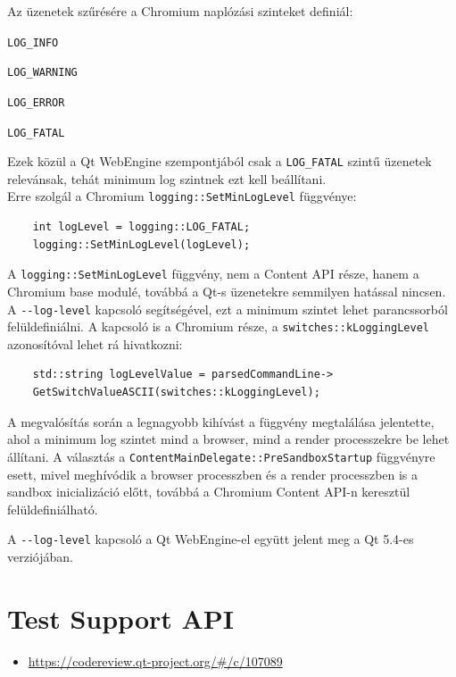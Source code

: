 \documentclass[12pt]{report}
\let\origurl\url
\renewcommand{\url}[1]{%
    \textcolor{blue}{\origurl{#1}}
}
\newcommand{\gerrit}[1]{%
    \textcolor{qtgreen}{\origurl{https://codereview.qt-project.org/\#/c/#1}}
}
\begin{document}
Az üzenetek szűrésére a Chromium naplózási szinteket definiál:
\begin{description}[
            labelsep=-0.5cm,
            itemsep=0cm,
            before={\renewcommand\makelabel[1]{\bfseries ##1}}]
    \item[0] \texttt{LOG\_INFO}
    \item[1] \texttt{LOG\_WARNING}
    \item[2] \texttt{LOG\_ERROR}
    \item[3] \texttt{LOG\_FATAL}
\end{description}
Ezek közül a Qt WebEngine szempontjából csak a \texttt{LOG\_FATAL} szintű üzenetek
relevánsak, tehát minimum log szintnek ezt kell beállítani. \\
Erre szolgál a Chromium \texttt{logging::SetMinLogLevel} függvénye:
\begin{verbatim}
    int logLevel = logging::LOG_FATAL;
    logging::SetMinLogLevel(logLevel);
\end{verbatim}
A \texttt{logging::SetMinLogLevel} függvény, nem a Content API része, hanem a \\
Chromium base modulé, továbbá a Qt-s üzenetekre semmilyen hatással nincsen. \\
A \texttt{-{}-log-level} kapcsoló segítségével, ezt a minimum szintet lehet
parancssorból felüldefiniálni. A kapcsoló is a Chromium része, a
\texttt{switches::kLoggingLevel} azonosítóval lehet rá hivatkozni:
\begin{verbatim}
    std::string logLevelValue = parsedCommandLine->
    GetSwitchValueASCII(switches::kLoggingLevel);
\end{verbatim}

A megvalósítás során a legnagyobb kihívást a függvény megtalálása jelentette, ahol a minimum
log szintet mind a browser, mind a render processzekre be lehet állítani.
A választás a \texttt{ContentMainDelegate::PreSandboxStartup} függvényre esett, mivel
meghívódik a browser processzben és a render processzben is a sandbox inicializáció előtt,
továbbá a Chromium Content API-n keresztül felüldefiniálható.

A \texttt{-{}-log-level} kapcsoló a Qt WebEngine-el együtt jelent meg a Qt 5.4-es
verziójában.


\section{Test Support API}

\begin{center}
    \begin{reviewbox}
        \begin{itemize}
            \renewcommand{\labelitemi}{\textcolor{qtgreen}{$\blacktriangleright$}}
            \item \gerrit{107089}
        \end{itemize}
    \end{reviewbox}
\end{center}
\end{document}
